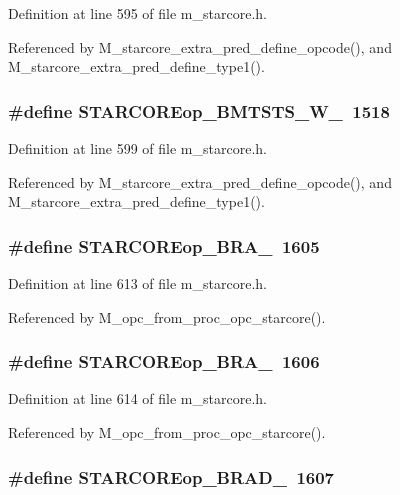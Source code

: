 Definition at line 595 of file m\_\-starcore.h.

Referenced by M\_\-starcore\_\-extra\_\-pred\_\-define\_\-opcode(), and M\_\-starcore\_\-extra\_\-pred\_\-define\_\-type1().
\subsubsection{\setlength{\rightskip}{0pt plus 5cm}\#define STARCOREop\_\-BMTSTS\_\-W\_~1518}\label{m__starcore_8h_39555b37d6d1310a15161ce3d7fac5cb}




Definition at line 599 of file m\_\-starcore.h.

Referenced by M\_\-starcore\_\-extra\_\-pred\_\-define\_\-opcode(), and M\_\-starcore\_\-extra\_\-pred\_\-define\_\-type1().
\subsubsection{\setlength{\rightskip}{0pt plus 5cm}\#define STARCOREop\_\-BRA\_~1605}\label{m__starcore_8h_dcff54482802770ea6021c7a71c5ddc1}




Definition at line 613 of file m\_\-starcore.h.

Referenced by M\_\-opc\_\-from\_\-proc\_\-opc\_\-starcore().
\subsubsection{\setlength{\rightskip}{0pt plus 5cm}\#define STARCOREop\_\-BRA\_~1606}\label{m__starcore_8h_6ec51ce29577663c165fc168ffe754f1}




Definition at line 614 of file m\_\-starcore.h.

Referenced by M\_\-opc\_\-from\_\-proc\_\-opc\_\-starcore().
\subsubsection{\setlength{\rightskip}{0pt plus 5cm}\#define STARCOREop\_\-BRAD\_~1607}\label{m__starcore_8h_04b15ac0654e4077428d8eaf988b9050}




